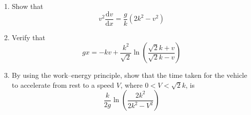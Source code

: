 \documentclass[leqno]{article}
\begin{document}
\begin{enumerate}[
  label=\textbf{\arabic*.},
  leftmargin=*,
  topsep=0pt,
  partopsep=0pt,
  parsep=0pt
]
\begin{enumerate}[label=\textbf{(\alph*)}]
  \item Show that
  \[
  v^2\dfrac{\mathrm{d}v}{\mathrm{d}x}=\dfrac{g}{k}\left(2k^2-v^2\right)
  \]
  \item Verify that
  \[
  gx=-kv+\dfrac{k^2}{\sqrt{2}}\ln\left(\dfrac{\sqrt{2}k+v}{\sqrt{2}k-v}\right)
  \]
  \item By using the work--energy principle, show that the time taken for the vehicle to accelerate from rest to a speed $V$, where $0<V<\sqrt{2}k$, is
  \[
  \dfrac{k}{2g}\ln\left(\dfrac{2k^2}{2k^2-V^2}\right)
  \]
\end{enumerate}

\end{enumerate}
\end{document}
